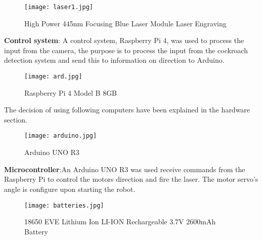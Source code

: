 \documentclass[11pt]{article}
\begin{document}
	\begin{center}
		
		
		\begin{figure}[H]
			\centering
			\texttt{[image: laser1.jpg]}
			\caption{High Power 445nm Focusing Blue Laser Module Laser Engraving}  
			\label{fig:Flowchart}
		\end{figure}
	\end{center}
	
	\textbf{Control system}: A control system, Raspberry Pi 4,  was used to process the input from the camera, the purpose is to process the input from the cockroach detection system and send this to information on direction to Arduino.
	
	\begin{center}
		
		
		\begin{figure}[H]
			\centering
			\texttt{[image: ard.jpg]}
			\caption{ Raspberry Pi 4 Model B 8GB }
			\label{fig:Flowchart}
		\end{figure}
	\end{center}
	
	The decision of using following computers have been explained in the hardware section.
	\begin{center}
		
		
		
		
		\begin{figure}[H]
			\centering
			\texttt{[image: arduino.jpg]}
			\caption{ Arduino UNO R3 }
			\label{fig:Flowchart}
		\end{figure}
	\end{center}

		
		
		
			\textbf{Microcontroller}:An Arduino UNO R3 was used receive commands from the Raspberry Pi to control the motors direction and fire the laser. The motor servo's angle is configure upon starting the robot.
			\begin{center}
			
			
			\begin{figure}[H]
				\centering
				\texttt{[image: batteries.jpg]}
				\caption{  18650 EVE Lithium Ion LI-ION Rechargeable 3.7V 2600mAh Battery }
				\label{fig:Flowchart}
			\end{figure}
		\end{center}
	
\end{document}
